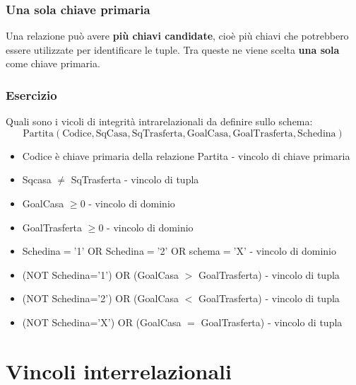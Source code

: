 \subsubsection{Una sola chiave primaria}
Una relazione può avere \textbf{più chiavi candidate}, cioè più chiavi
che potrebbero essere utilizzate per identificare le tuple.
Tra queste ne viene scelta \textbf{una sola} come chiave primaria.
\subsubsection{Esercizio}
Quali sono i vicoli di integrità intrarelazionali da definire sullo schema:
\[
\text{Partita}(
\text{Codice},
\text{SqCasa},
\text{SqTrasferta},
\text{GoalCasa},
\text{GoalTrasferta},
\text{Schedina})
\]

\begin{itemize}
    \item Codice è chiave primaria della relazione Partita - vincolo di chiave primaria
    \item Sqcasa $\neq$ SqTrasferta - vincolo di tupla
    \item GoalCasa $\ge0$ - vincolo di dominio
    \item GoalTrasferta $\ge 0$ - vincolo di dominio
    \item Schedina$=$'1' OR Schedina$=$'2' OR schema$=$'X' - vincolo di dominio
    \item (NOT Schedina='1') OR (GoalCasa $>$ GoalTrasferta) - vincolo di tupla
    \item (NOT Schedina='2') OR (GoalCasa $<$ GoalTrasferta) - vincolo di tupla
    \item (NOT Schedina='X') OR (GoalCasa $=$ GoalTrasferta) - vincolo di tupla
\end{itemize}

\section{Vincoli interrelazionali}
